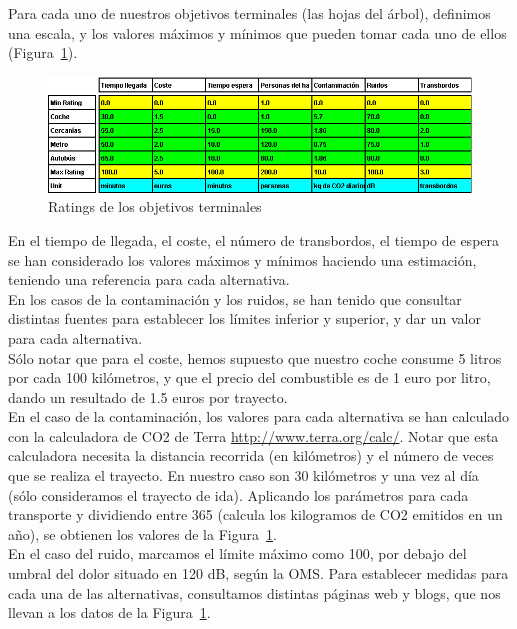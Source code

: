 \documentclass[12pt,a4paper,twoside,openright,titlepage,final]{article}
\begin{document}
Para cada uno de nuestros objetivos terminales (las hojas del árbol), definimos una escala, y los valores máximos y mínimos que pueden tomar cada uno de ellos (Figura~\ref{fig:ratings}).\\

\begin{figure}[tbph!]
	\centering
	\includegraphics[width=\linewidth]{imagenes/ratings}
	\caption{Ratings de los objetivos terminales}
	\label{fig:ratings}
\end{figure}

En el tiempo de llegada, el coste, el número de transbordos, el tiempo de espera se han considerado los valores máximos y mínimos haciendo una estimación, teniendo una referencia para cada alternativa.\\

En los casos de la contaminación y los ruidos, se han tenido que consultar distintas fuentes para establecer los límites inferior y superior, y dar un valor para cada alternativa.\\

Sólo notar que para el coste, hemos supuesto que nuestro coche consume 5 litros por cada 100 kilómetros, y que el precio del combustible es de 1 euro por litro, dando un resultado de 1.5 euros por trayecto.\\ 

En el caso de la contaminación, los valores para cada alternativa se han calculado con la calculadora de CO2 de Terra \url{http://www.terra.org/calc/}. Notar que esta calculadora necesita la distancia recorrida (en kilómetros) y el número de veces que se realiza el trayecto. En nuestro caso son 30 kilómetros y una vez al día (sólo consideramos el trayecto de ida). Aplicando los parámetros para cada transporte y dividiendo entre 365 (calcula los kilogramos de CO2 emitidos en un año), se obtienen los valores de la Figura~\ref{fig:ratings}.\\

En el caso del ruido, marcamos el límite máximo como 100, por debajo del umbral del dolor situado en 120 dB, según la OMS. Para establecer medidas para cada una de las alternativas, consultamos distintas páginas web y blogs, que nos llevan a los datos de la Figura~\ref{fig:ratings}.\\
\end{document}

